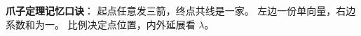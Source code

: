 \begin{summarybox}
\textbf{爪子定理记忆口诀}：
起点任意发三箭，终点共线是一家。
左边一份单向量，右边系数和为一。
比例决定点位置，内外延展看 $\lambda$。
\end{summarybox}
